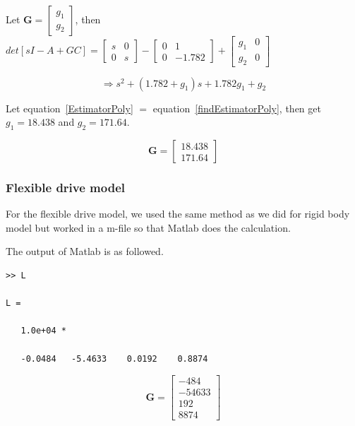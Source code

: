 \documentclass[a4paper, 12pt]{article}
\begin{document}
Let $\mathbf{G} = \begin{bmatrix} g_1 \\ g_2 \end{bmatrix}$, then $det[sI - A + GC] = 
\begin{bmatrix}
s	&	0\\
0	&	s
\end{bmatrix} - \begin{bmatrix}
0	&	1	\\
0	&	-1.782
\end{bmatrix} + \begin{bmatrix}
g_1	&	0	\\
g_2	&	0
\end{bmatrix}$

\begin{equation}\label{findEstimatorPoly}
\Longrightarrow s^2 + (1.782+g_1)s + 1.782g_1 + g_2
\end{equation}

Let equation~\ref{EstimatorPoly} $= $ equation~\ref{findEstimatorPoly}, then get $g_1 = 18.438$ and $g_2 = 171.64$.

\begin{equation}\label{G4rigid}
\mathbf{G} = \begin{bmatrix} 18.438 	\\	171.64	\end{bmatrix}
\end{equation}

\subsubsection{Flexible drive model}
\hspace{2.5ex}
For the flexible drive model, we used the same method as we did for rigid body model but worked in a m-file so that Matlab does the calculation. 

The output of Matlab is as followed.
\begin{verbatim}
>> L

L =

   1.0e+04 *

   -0.0484   -5.4633    0.0192    0.8874
\end{verbatim}

\begin{equation}\label{G4flexible}
\mathbf{G} = 
\begin{bmatrix}
-484	\\	-54633	\\	192	\\	8874
\end{bmatrix}
\end{equation}
\end{document}
